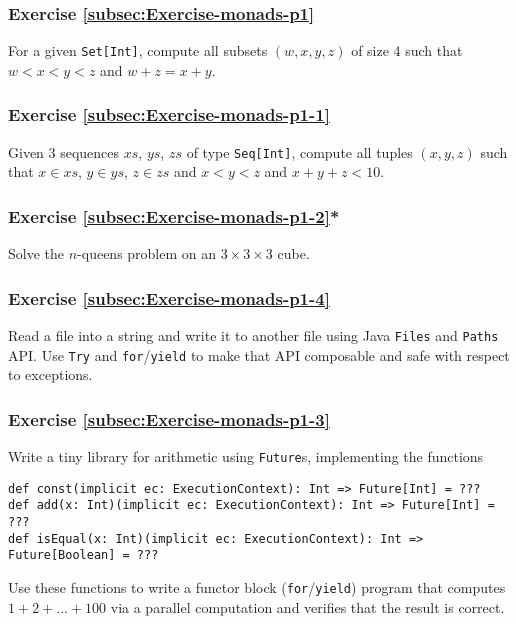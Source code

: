 \subsubsection{Exercise \label{subsec:Exercise-monads-p1}\ref{subsec:Exercise-monads-p1}}

For a given \lstinline!Set[Int]!, compute all subsets $\left(w,x,y,z\right)$
of size 4 such that $w<x<y<z$ and $w+z=x+y$.

\subsubsection{Exercise \label{subsec:Exercise-monads-p1-1}\ref{subsec:Exercise-monads-p1-1}}

Given 3 sequences $xs$, $ys$, $zs$ of type \lstinline!Seq[Int]!,
compute all tuples $\left(x,y,z\right)$ such that $x\in xs$, $y\in ys$,
$z\in zs$ and $x<y<z$ and $x+y+z<10$.

\subsubsection{Exercise \label{subsec:Exercise-monads-p1-2}\ref{subsec:Exercise-monads-p1-2}{*}}

Solve the $n$-queens problem on an $3\times3\times3$ cube.

\subsubsection{Exercise \label{subsec:Exercise-monads-p1-4}\ref{subsec:Exercise-monads-p1-4}}

Read a file into a string and write it to another file using Java
\lstinline!Files! and \lstinline!Paths! API. Use \lstinline!Try!
and \lstinline!for!/\lstinline!yield! to make that API composable
and safe with respect to exceptions.

\subsubsection{Exercise \label{subsec:Exercise-monads-p1-3}\ref{subsec:Exercise-monads-p1-3}}

Write a tiny library for arithmetic using \lstinline!Future!s, implementing
the functions
\begin{lstlisting}
def const(implicit ec: ExecutionContext): Int => Future[Int] = ???
def add(x: Int)(implicit ec: ExecutionContext): Int => Future[Int] = ???
def isEqual(x: Int)(implicit ec: ExecutionContext): Int => Future[Boolean] = ??? 
\end{lstlisting}
Use these functions to write a functor block (\lstinline!for!/\lstinline!yield!)
program that computes $1+2+...+100$ via a parallel computation and
verifies that the result is correct.

